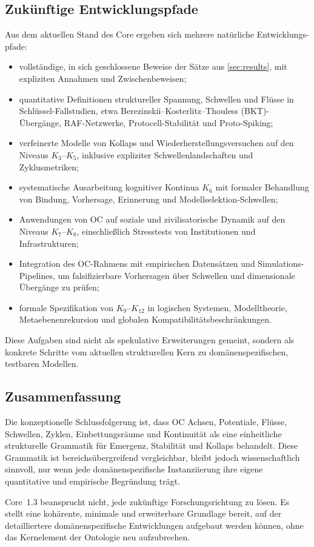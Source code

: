 \subsection{Zukünftige Entwicklungspfade}

Aus dem aktuellen Stand des Core ergeben sich mehrere natürliche Entwicklungs-
pfade:

\begin{itemize}
    \item vollständige, in sich geschlossene Beweise der Sätze aus
          \cref{sec:results}, mit expliziten Annahmen und Zwischenbeweisen;
    \item quantitative Definitionen struktureller Spannung, Schwellen und Flüsse in
          Schlüssel-Fallstudien, etwa Berezinskii--Kosterlitz--Thouless (BKT)-
          Übergänge, RAF-Netzwerke, Protocell-Stabilität und Proto-Spiking;
    \item verfeinerte Modelle von Kollaps und Wiederherstellungsversuchen auf den
          Niveaus \(K_3\)–\(K_5\), inklusive expliziter
          Schwellenlandschaften und Zyklusmetriken;
    \item systematische Ausarbeitung kognitiver Kontinua \(K_6\) mit formaler
          Behandlung von Bindung, Vorhersage, Erinnerung und
          Modellselektion-Schwellen;
    \item Anwendungen von OC auf soziale und zivilisatorische Dynamik auf den
          Niveaus \(K_7\)–\(K_{8}\), einschließlich Stresstests von Institutionen
          und Infrastrukturen;
    \item Integration des OC-Rahmens mit empirischen Datensätzen und
          Simulations-Pipelines, um falsifizierbare Vorhersagen über
          Schwellen und dimensionale Übergänge zu prüfen;
    \item formale Spezifikation von \(K_9\)–\(K_{12}\) in logischen
          Systemen, Modelltheorie, Metaebenenrekursion und globalen
          Kompatibilitätsbeschränkungen.
\end{itemize}

Diese Aufgaben sind nicht als spekulative Erweiterungen gemeint, sondern als
konkrete Schritte vom aktuellen strukturellen Kern zu domänenspezifischen,
testbaren Modellen.

\subsection{Zusammenfassung}

Die konzeptionelle Schlussfolgerung ist, dass OC Achsen, Potentiale, Flüsse,
Schwellen, Zyklen, Einbettungsräume und Kontinuität als eine einheitliche
strukturelle Grammatik für Emergenz, Stabilität und Kollaps behandelt.
Diese Grammatik ist bereichsübergreifend vergleichbar, bleibt jedoch wissenschaftlich
sinnvoll, nur wenn jede domänenspezifische Instanziierung ihre eigene
quantitative und empirische Begründung trägt.

Core~1.3 beansprucht nicht, jede zukünftige Forschungsrichtung zu lösen. Es
stellt eine kohärente, minimale und erweiterbare Grundlage bereit, auf der
detailliertere domänenspezifische Entwicklungen aufgebaut werden können,
ohne das Kernelement der Ontologie neu aufzubrechen.



